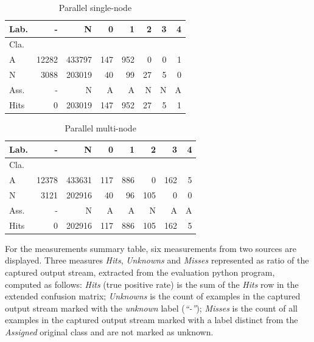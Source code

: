 \begin{table}[hbt]%
{\scriptsize
\setlength\tabcolsep{0.35em}
\begin{center}
\caption{Parallel single-node}
\label{tab:single-node-matrix}
\begin{tabular}{l|r|r|r|r|r|r|r}
  Lab. &      - &       N &    0 &    1 &   2 &  3 &  4 \\\hline
  Cla.  &        &         &      &      &     &    &    \\\hline
  \hline
  A        &  12282 &  433797 &  147 &  952 &   0 &  0 &  1 \\\hline
  N        &   3088 &  203019 &   40 &   99 &  27 &  5 &  0 \\\hline
  \hline
  Ass. &      - &       N &    A &    A &   N &  N &  A \\\hline
  Hits     &      0 &  203019 &  147 &  952 &  27 &  5 &  1 
\end{tabular}
\end{center}
}
\end{table}
% 
% 
\begin{table}[hbt]%
{\scriptsize
\setlength\tabcolsep{0.35em}
\begin{center}
\caption{Parallel multi-node}
\label{tab:multi-node-matrix}
\begin{tabular}{l|r|r|r|r|r|r|r}
  Lab.   &      - &       N &    0 &    1 &    2 &    3 &  4 \\\hline
  Cla.   &        &         &      &      &      &      &    \\\hline
  \hline
  A      &  12378 &  433631 &  117 &  886 &    0 &  162 &  5 \\\hline
  N      &   3121 &  202916 &   40 &   96 &  105 &    0 &  0 \\\hline
  \hline
  Ass.   &      - &       N &    A &    A &    N &    A &  A \\\hline
  Hits   &      0 &  202916 &  117 &  886 &  105 &  162 &  5 
\end{tabular}
\end{center}
}
\end{table}


For the measurements summary table, six measurements from two sources are displayed. Three
measures \emph{Hits}, \emph{Unknowns} and \emph{Misses} represented as ratio of
the captured output stream, extracted from the evaluation python program,
computed as follows:
\emph{Hits} (true positive rate) is the sum of the \emph{Hits} row in the
extended confusion matrix;
\emph{Unknowns} is the count of examples in the captured output stream marked
with the \emph{unknown} label (\emph{``-''});
\emph{Misses} is the count of all examples in the captured output stream marked
with a label distinct from the \emph{Assigned} original class and are not marked
as unknown.

